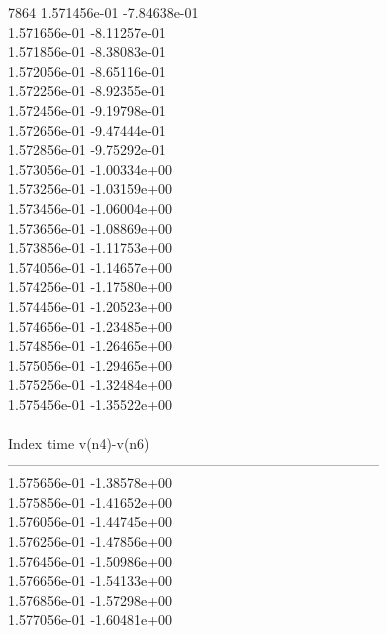 7864	1.571456e-01	-7.84638e-01	\\ 	1.571656e-01	-8.11257e-01	\\ 	1.571856e-01	-8.38083e-01	\\ 	1.572056e-01	-8.65116e-01	\\ 	1.572256e-01	-8.92355e-01	\\ 	1.572456e-01	-9.19798e-01	\\ 	1.572656e-01	-9.47444e-01	\\ 	1.572856e-01	-9.75292e-01	\\ 	1.573056e-01	-1.00334e+00	\\ 	1.573256e-01	-1.03159e+00	\\ 	1.573456e-01	-1.06004e+00	\\ 	1.573656e-01	-1.08869e+00	\\ 	1.573856e-01	-1.11753e+00	\\ 	1.574056e-01	-1.14657e+00	\\ 	1.574256e-01	-1.17580e+00	\\ 	1.574456e-01	-1.20523e+00	\\ 	1.574656e-01	-1.23485e+00	\\ 	1.574856e-01	-1.26465e+00	\\ 	1.575056e-01	-1.29465e+00	\\ 	1.575256e-01	-1.32484e+00	\\ 	1.575456e-01	-1.35522e+00	\\ \hline
\\ \hline
Index   time            v(n4)-v(n6)     \\ \hline
--------------------------------------------------------------------------------\\ 	1.575656e-01	-1.38578e+00	\\ 	1.575856e-01	-1.41652e+00	\\ 	1.576056e-01	-1.44745e+00	\\ 	1.576256e-01	-1.47856e+00	\\ 	1.576456e-01	-1.50986e+00	\\ 	1.576656e-01	-1.54133e+00	\\ 	1.576856e-01	-1.57298e+00	\\ 	1.577056e-01	-1.60481e+00	\\ \hline
